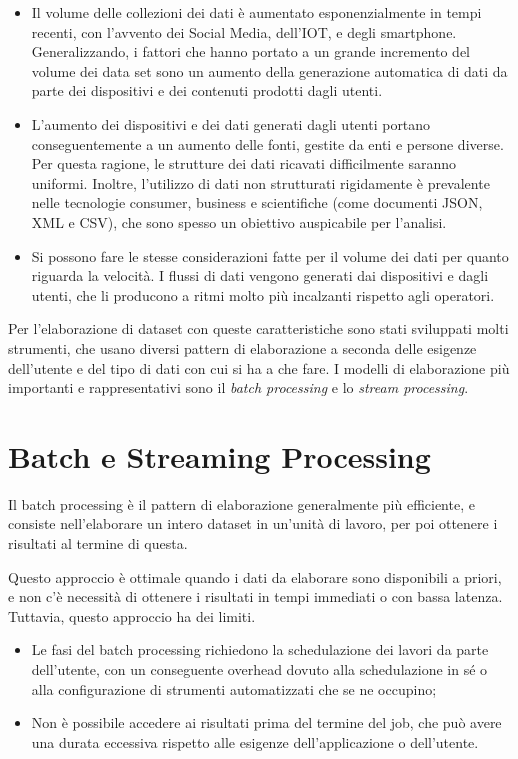 \documentclass[italian,a4paper, twoside, 12pt]{report}
\begin{document}
\begin{itemize}
\item
  Il volume delle collezioni dei dati è aumentato esponenzialmente in
  tempi recenti, con l'avvento dei Social Media, dell'IOT, e degli
  smartphone. Generalizzando, i fattori che hanno portato a un grande
  incremento del volume dei data set sono un aumento della generazione
  automatica di dati da parte dei dispositivi e dei contenuti prodotti
  dagli utenti.
\item
  L'aumento dei dispositivi e dei dati generati dagli utenti portano
  conseguentemente a un aumento delle fonti, gestite da enti e persone
  diverse. Per questa ragione, le strutture dei dati ricavati
  difficilmente saranno uniformi. Inoltre, l'utilizzo di dati non
  strutturati rigidamente è prevalente nelle tecnologie consumer,
  business e scientifiche (come documenti JSON, XML e CSV), che sono
  spesso un obiettivo auspicabile per l'analisi.
\item
  Si possono fare le stesse considerazioni fatte per il volume dei dati
  per quanto riguarda la velocità. I flussi di dati vengono generati dai
  dispositivi e dagli utenti, che li producono a ritmi molto più
  incalzanti rispetto agli operatori.
\end{itemize}

Per l'elaborazione di dataset con queste caratteristiche sono stati
sviluppati molti strumenti, che usano diversi pattern di elaborazione a
seconda delle esigenze dell'utente e del tipo di dati con cui si ha a
che fare. I modelli di elaborazione più importanti e rappresentativi
sono il \emph{batch processing} e lo \emph{stream processing}.

\section{Batch e Streaming
Processing}\label{batch-e-streaming-processing}

Il batch processing è il pattern di elaborazione generalmente più
efficiente, e consiste nell'elaborare un intero dataset in un'unità di
lavoro, per poi ottenere i risultati al termine di questa.

Questo approccio è ottimale quando i dati da elaborare sono disponibili
a priori, e non c'è necessità di ottenere i risultati in tempi immediati
o con bassa latenza. Tuttavia, questo approccio ha dei limiti.

\begin{itemize}
\item
  Le fasi del batch processing richiedono la schedulazione dei lavori da
  parte dell'utente, con un conseguente overhead dovuto alla
  schedulazione in sé o alla configurazione di strumenti automatizzati
  che se ne occupino;
\item
  Non è possibile accedere ai risultati prima del termine del job, che
  può avere una durata eccessiva rispetto alle esigenze
  dell'applicazione o dell'utente.
\end{itemize}
\end{document}
